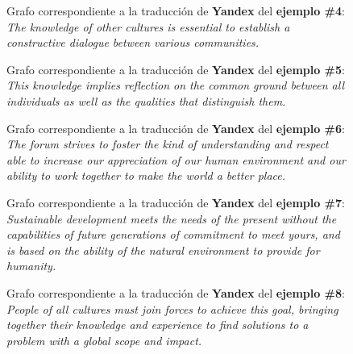\documentclass[a4paper,12pt,spanish]{book}
\begin{document}
\begin{figure}[htbp]
\centering
\capstart

\caption[Grafo correspondiente a la traducción de Yandex del ejemplo \#4.]{Grafo correspondiente a la traducción de \textbf{Yandex} del \textbf{ejemplo \#4}:
\emph{The knowledge of other cultures is essential to establish a constructive
dialogue between various communities.}}\label{appendix-data:sample04-yandex}\end{figure}
\begin{figure}[htbp]
\centering
\capstart

\caption[Grafo correspondiente a la traducción de Yandex del ejemplo \#5.]{Grafo correspondiente a la traducción de \textbf{Yandex} del \textbf{ejemplo \#5}:
\emph{This knowledge implies reflection on the common ground between all
individuals as well as the qualities that distinguish them.}}\label{appendix-data:sample05-yandex}\end{figure}
\begin{figure}[htbp]
\centering
\capstart

\caption[Grafo correspondiente a la traducción de Yandex del ejemplo \#6.]{Grafo correspondiente a la traducción de \textbf{Yandex} del \textbf{ejemplo \#6}:
\emph{The forum strives to foster the kind of understanding and respect able
to increase our appreciation of our human environment and our ability
to work together to make the world a better place.}}\label{appendix-data:sample06-yandex}\end{figure}
\begin{figure}[htbp]
\centering
\capstart

\caption[Grafo correspondiente a la traducción de Yandex del ejemplo \#7.]{Grafo correspondiente a la traducción de \textbf{Yandex} del \textbf{ejemplo \#7}:
\emph{Sustainable development meets the needs of the present without the
capabilities of future generations of commitment to meet yours, and
is based on the ability of the natural environment to provide for humanity.}}\label{appendix-data:sample07-yandex}\end{figure}
\begin{figure}[htbp]
\centering
\capstart

\caption[Grafo correspondiente a la traducción de Yandex del ejemplo \#8.]{Grafo correspondiente a la traducción de \textbf{Yandex} del \textbf{ejemplo \#8}:
\emph{People of all cultures must join forces to achieve this goal, bringing
together their knowledge and experience to find solutions to a problem
with a global scope and impact.}}\label{appendix-data:sample08-yandex}\end{figure}
\end{document}
